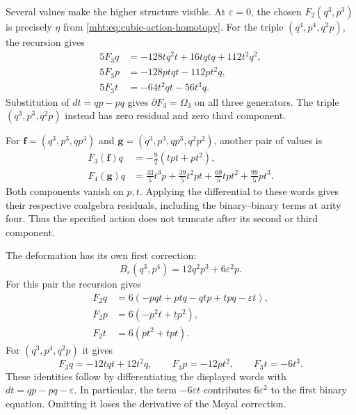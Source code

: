 Several values make the higher structure visible. At
$\varepsilon=0$, the chosen $F_2(q^3,p^3)$ is precisely
$\eta$ from \eqref{mht:eq:cubic-action-homotopy}. For the triple
$(q^4,p^4,q^2p)$, the recursion gives
\begin{equation}\label{mht:eq:quartic-ternary-action}
 \begin{aligned}
 5F_3q&=-128tq^2t+16tqtq+112t^2q^2,\\
 5F_3p&=-128ptqt-112pt^2q,\\
 5F_3t&=-64t^2qt-56t^3q.
 \end{aligned}
\end{equation}
Substitution of $dt=qp-pq$ gives $\partial F_3=\Omega_3$
on all three generators. The triple $(q^3,p^3,q^2p)$ instead
has zero residual and zero third component.

For $\mathbf f=(q^3,p^3,qp^3)$ and
$\mathbf g=(q^3,p^3,qp^3,q^2p^2)$, another pair of values is
\begin{equation}\label{mht:eq:third-fourth-action}
 \begin{aligned}
 F_3(\mathbf f)q&=-\tfrac92(tpt+pt^2),\\
 F_4(\mathbf g)q&=\tfrac{33}{5}t^3p+\tfrac{39}{5}t^2pt
                  +\tfrac{69}{5}tpt^2+\tfrac{99}{5}pt^3.
 \end{aligned}
\end{equation}
Both components vanish on $p,t$. Applying the differential to
these words gives their respective coalgebra residuals, including
the binary--binary terms at arity four. Thus the specified action
does not truncate after its second or third component.

The deformation has its own first correction:
\[
 B_\varepsilon(q^3,p^4)=12q^2p^3+6\varepsilon^2p.
\]
For this pair the recursion gives
\begin{equation}\label{mht:eq:quantum-binary-action}
 \begin{aligned}
 F_2q&=6(-pqt+ptq-qtp+tpq-\varepsilon t),\\
 F_2p&=6(-p^2t+tp^2),\\
 F_2t&=6(pt^2+tpt).
 \end{aligned}
\end{equation}
For $(q^3,p^4,q^2p)$ it gives
\[
 F_3q=-12tqt+12t^2q,\qquad
 F_3p=-12pt^2,\qquad F_3t=-6t^3.
\]
These identities follow by differentiating the displayed words
with $dt=qp-pq-\varepsilon$. In particular, the term
$-6\varepsilon t$ contributes $6\varepsilon^2$ to the first
binary equation. Omitting it loses the derivative of the Moyal
correction.

